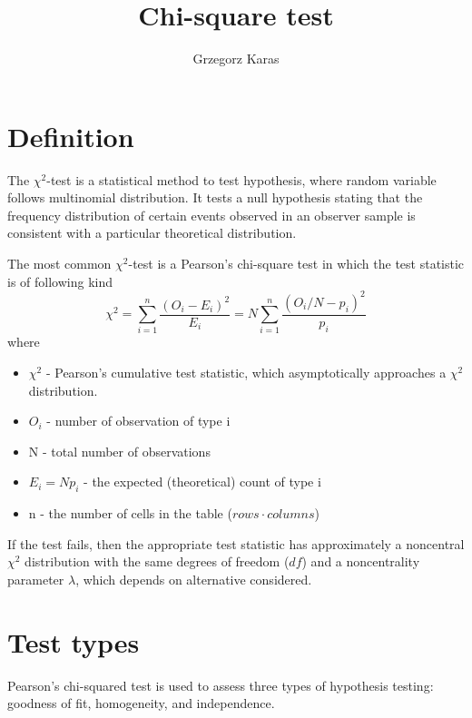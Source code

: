 \documentclass{article}
\title{Chi-square test}
\author{Grzegorz Karas}
\begin{document}
\maketitle


\section{Definition \cite{wiki, paper}}
The $\chi^2$-test is a statistical method to test hypothesis, where random variable
follows multinomial distribution. It tests a null hypothesis stating that the frequency distribution of certain 
events observed in an observer sample is consistent with a particular theoretical distribution.

The most common $\chi^2$-test is a Pearson's chi-square test in which the test statistic is of following kind
\begin{equation}
    \chi^2=\sum_{i=1}^n \frac{\left(O_i-E_i\right)^2}{E_i} = N \sum_{i=1}^n \frac{\left(O_i/N-p_i\right)^2}{p_i}
\end{equation}
where
\begin{itemize}
    \item $\chi^2$ - Pearson's cumulative test statistic, which asymptotically approaches a $\chi^2$ distribution.
    \item $O_i$ - number of observation of type i
    \item N - total number of observations
    \item $E_i = Np_i$ - the expected (theoretical) count of type i
    \item n - the number of cells in the table ($rows\cdot columns$)
\end{itemize}

If the test fails, then the appropriate test statistic has approximately 
a noncentral $\chi^2$ distribution with the same degrees of freedom ($df$) and
a noncentrality parameter $\lambda$, which depends on alternative considered.

\section{Test types \cite{wiki}}
Pearson's chi-squared test is used to assess three types of hypothesis testing: 
goodness of fit, homogeneity, and independence.
\end{document}
